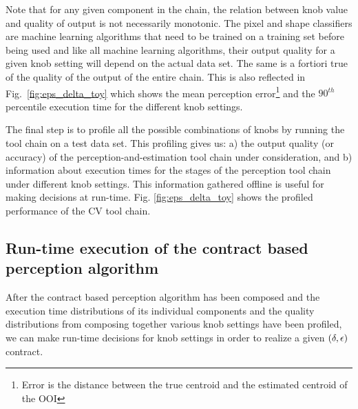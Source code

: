 Note that for any given component in the chain, the relation between knob value and quality of output is not necessarily monotonic. The pixel and shape classifiers are machine learning algorithms that need to be trained on a training set before being used and like all machine learning algorithms, their output quality for a given knob setting will depend on the actual data set.
The same is a fortiori true of the quality of the output of the entire chain. This is also reflected in Fig.~\ref{fig:eps_delta_toy} which shows the mean perception error\footnote{Error is the distance between the true centroid and the estimated centroid of the OOI} and the $90^{th}$ percentile execution time for the different knob settings. 

The final step is to profile all the possible combinations of knobs by running the tool chain on a test data set.
This profiling gives us: a) the output quality (or accuracy) of the perception-and-estimation tool chain under consideration, and b) information about execution times for the stages of the perception tool chain under different knob settings. 
This information gathered offline is useful for making decisions at run-time. 
Fig. \ref{fig:eps_delta_toy} shows the profiled performance of the CV tool chain.


\subsection{Run-time execution of the contract based perception algorithm}

After the contract based perception algorithm has been composed and the execution time distributions of its individual components and the quality distributions from composing together various knob settings have been profiled, we can make run-time decisions for knob settings in order to realize a given $(\delta,\epsilon)$ contract. 

